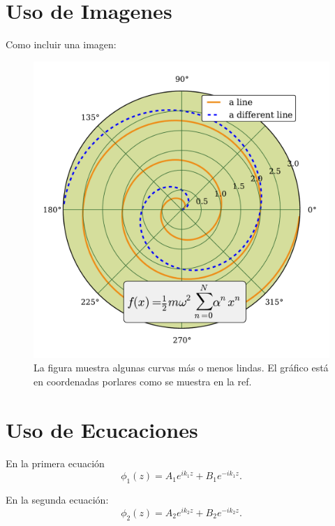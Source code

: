 \section{Uso de Imagenes}
\label{S:uso-de-imagenes}
Como incluir una imagen:\\
\begin{figure}[!ht]
\centering\includegraphics[width=\imsize]{cap2_f1}
\caption[La figura muestra algunas curvas m\'{a}s o menos lindas]{La figura muestra algunas curvas m\'{a}s o menos lindas. El gr\'{a}fico est\'{a} en coordenadas porlares como se muestra en la ref.~}
\end{figure}

\section{Uso de Ecucaciones}
\label{S:uso-de-ecuaciones}
En la primera ecuaci\'{o}n
\begin{equation}
\phi_{1}(z)=A_{1}e^{ik_{1}z}+B_{1}e^{-ik_{1}z}.
\end{equation}

En la segunda ecuaci\'{o}n:
\begin{equation}
\phi_{2}(z)=A_{2}e^{ik_{2}z}+B_{2}e^{-ik_{2}z}.
\end{equation}


